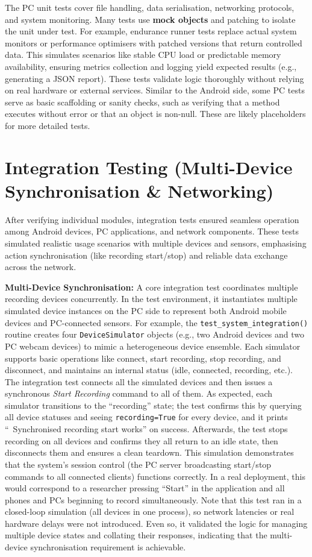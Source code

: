 The PC unit tests cover file handling, data serialisation, networking protocols, and system monitoring. Many tests use \textbf{mock objects} and patching to isolate the unit under test. For example, endurance runner tests replace actual system monitors or performance optimisers with patched versions that return controlled data. This simulates scenarios like stable CPU load or predictable memory availability, ensuring metrics collection and logging yield expected results (e.g., generating a JSON report). These tests validate logic thoroughly without relying on real hardware or external services. Similar to the Android side, some PC tests serve as basic scaffolding or sanity checks, such as verifying that a method executes without error or that an object is non-null. These are likely placeholders for more detailed tests.

\section{Integration Testing (Multi-Device Synchronisation \& Networking)}
After verifying individual modules, integration tests ensured seamless operation among Android devices, PC applications, and network components. These tests simulated realistic usage scenarios with multiple devices and sensors, emphasising action synchronisation (like recording start/stop) and reliable data exchange across the network.

\textbf{Multi-Device Synchronisation:} A core integration test coordinates multiple recording devices concurrently. In the test environment, it instantiates multiple simulated device instances on the PC side to represent both Android mobile devices and PC-connected sensors. For example, the \texttt{test\_system\_integration()} routine creates four \texttt{DeviceSimulator} objects (e.g., two Android devices and two PC webcam devices) to mimic a heterogeneous device ensemble. Each simulator supports basic operations like connect, start recording, stop recording, and disconnect, and maintains an internal status (idle, connected, recording, etc.). The integration test connects all the simulated devices and then issues a synchronous \emph{Start Recording} command to all of them. As expected, each simulator transitions to the ``recording'' state; the test confirms this by querying all device statuses and seeing \texttt{recording=True} for every device, and it prints ``\checkmark\ Synchronised recording start works'' on success. Afterwards, the test stops recording on all devices and confirms they all return to an idle state, then disconnects them and ensures a clean teardown. This simulation demonstrates that the system's session control (the PC server broadcasting start/stop commands to all connected clients) functions correctly. In a real deployment, this would correspond to a researcher pressing ``Start'' in the application and all phones and PCs beginning to record simultaneously. Note that this test ran in a closed-loop simulation (all devices in one process), so network latencies or real hardware delays were not introduced. Even so, it validated the logic for managing multiple device states and collating their responses, indicating that the multi-device synchronisation requirement is achievable.


